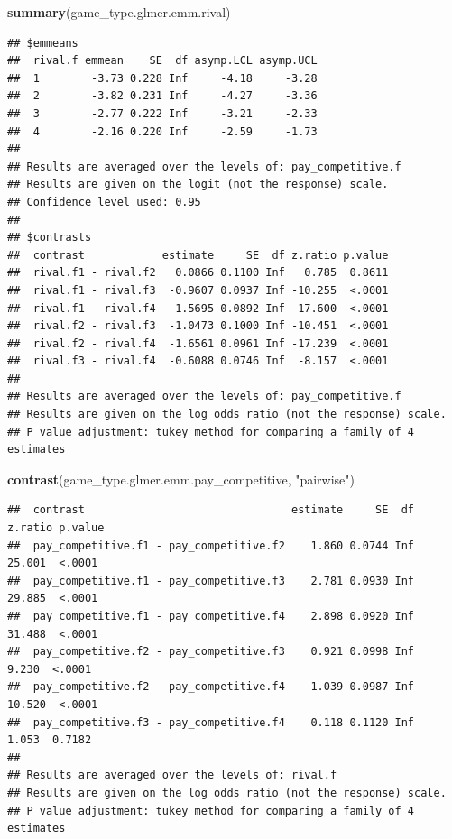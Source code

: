 \documentclass[
]{article}
\newenvironment{Shaded}{\begin{snugshade}}{\end{snugshade}}
\newcommand{\FunctionTok}[1]{\textcolor[rgb]{0.13,0.29,0.53}{\textbf{#1}}}
\newcommand{\NormalTok}[1]{#1}
\newcommand{\StringTok}[1]{\textcolor[rgb]{0.31,0.60,0.02}{#1}}
\begin{document}
\begin{Shaded}
\begin{Highlighting}[]
\FunctionTok{summary}\NormalTok{(game\_type.glmer.emm.rival)}
\end{Highlighting}
\end{Shaded}

\begin{verbatim}
## $emmeans
##  rival.f emmean    SE  df asymp.LCL asymp.UCL
##  1        -3.73 0.228 Inf     -4.18     -3.28
##  2        -3.82 0.231 Inf     -4.27     -3.36
##  3        -2.77 0.222 Inf     -3.21     -2.33
##  4        -2.16 0.220 Inf     -2.59     -1.73
## 
## Results are averaged over the levels of: pay_competitive.f 
## Results are given on the logit (not the response) scale. 
## Confidence level used: 0.95 
## 
## $contrasts
##  contrast            estimate     SE  df z.ratio p.value
##  rival.f1 - rival.f2   0.0866 0.1100 Inf   0.785  0.8611
##  rival.f1 - rival.f3  -0.9607 0.0937 Inf -10.255  <.0001
##  rival.f1 - rival.f4  -1.5695 0.0892 Inf -17.600  <.0001
##  rival.f2 - rival.f3  -1.0473 0.1000 Inf -10.451  <.0001
##  rival.f2 - rival.f4  -1.6561 0.0961 Inf -17.239  <.0001
##  rival.f3 - rival.f4  -0.6088 0.0746 Inf  -8.157  <.0001
## 
## Results are averaged over the levels of: pay_competitive.f 
## Results are given on the log odds ratio (not the response) scale. 
## P value adjustment: tukey method for comparing a family of 4 estimates
\end{verbatim}

\begin{Shaded}
\begin{Highlighting}[]
\FunctionTok{contrast}\NormalTok{(game\_type.glmer.emm.pay\_competitive, }\StringTok{"pairwise"}\NormalTok{)}
\end{Highlighting}
\end{Shaded}

\begin{verbatim}
##  contrast                                estimate     SE  df z.ratio p.value
##  pay_competitive.f1 - pay_competitive.f2    1.860 0.0744 Inf  25.001  <.0001
##  pay_competitive.f1 - pay_competitive.f3    2.781 0.0930 Inf  29.885  <.0001
##  pay_competitive.f1 - pay_competitive.f4    2.898 0.0920 Inf  31.488  <.0001
##  pay_competitive.f2 - pay_competitive.f3    0.921 0.0998 Inf   9.230  <.0001
##  pay_competitive.f2 - pay_competitive.f4    1.039 0.0987 Inf  10.520  <.0001
##  pay_competitive.f3 - pay_competitive.f4    0.118 0.1120 Inf   1.053  0.7182
## 
## Results are averaged over the levels of: rival.f 
## Results are given on the log odds ratio (not the response) scale. 
## P value adjustment: tukey method for comparing a family of 4 estimates
\end{verbatim}
\end{document}
